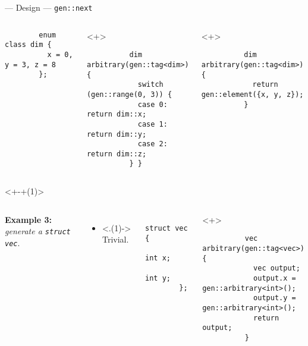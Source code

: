 \begin{frame}[fragile,t]{\halcheck{} --- Design --- \texttt{gen::next}}
\begin{onlyenv}
\begin{columns}[T]
      \begin{verbatim}
        enum class dim {
          x = 0, y = 3, z = 8
        };
      \end{verbatim}

      \begin{onlyenv}<+>
        \begin{verbatim}
          dim arbitrary(gen::tag<dim>) {
            switch (gen::range(0, 3)) {
            case 0: return dim::x;
            case 1: return dim::y;
            case 2: return dim::z;
          } }
        \end{verbatim}
      \end{onlyenv}

      \begin{onlyenv}<+>
        \begin{verbatim}
          dim arbitrary(gen::tag<dim>) {
            return gen::element({x, y, z});
          }
        \end{verbatim}
      \end{onlyenv}
    \end{columns}
  \end{onlyenv}

  \begin{onlyenv}<+-+(1)>
    \begin{columns}[T]
      \textbf{Example 3:} \emph{generate a \texttt{struct vec}}.

      \begin{itemize}
        \item<.(1)-> Trivial.
      \end{itemize}

      \begin{verbatim}
        struct vec {
          int x;
          int y;
        };
      \end{verbatim}

      \begin{onlyenv}<+>
        \begin{verbatim}
          vec arbitrary(gen::tag<vec>) {
            vec output;
            output.x = gen::arbitrary<int>();
            output.y = gen::arbitrary<int>();
            return output;
          }
        \end{verbatim}
      \end{onlyenv}
    \end{columns}
  \end{onlyenv}


\end{frame}
